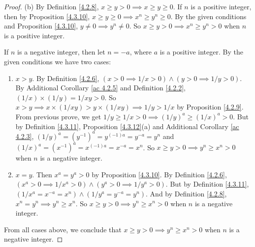 \begin{proof}{(b)}
By Definition \ref{4.2.8}, \(x \geq y > 0 \implies x \geq y \geq 0\).
If \(n\) is a positive integer, then by Proposition \ref{4.3.10}, \(x \geq y \geq 0 \implies x^n \geq y^n \geq 0\).
By the given conditions and Proposition \ref{4.3.10}, \(y \neq 0 \implies y^n \neq 0\).
So \(x \geq y > 0 \implies x^n \geq y^n > 0\) when \(n\) is a positive integer.

If \(n\) is a negative integer, then let \(n = -a\), where \(a\) is a positive integer.
By the given conditions we have two cases:
\begin{enumerate}[label=(\roman*)]
    \item \(x > y\).
    By Definition \ref{4.2.6}, \((x > 0 \implies 1 / x > 0) \land (y > 0 \implies 1 / y > 0)\).
    By Additional Corollary \ref{ac 4.2.5} and Definition \ref{4.2.2}, \((1 / x) \times (1 / y) = 1 / xy > 0\).
    So \(x > y \implies x \times (1 / xy) > y \times (1 / xy) \implies 1 / y > 1 / x\) by Proposition \ref{4.2.9}.
    From previous prove, we get \(1 / y \geq 1 / x > 0 \implies (1 / y)^a \geq (1 / x)^a > 0\).
    But by Definition \ref{4.3.11}, Proposition \ref{4.3.12}(a) and Additional Corollary \ref{ac 4.2.3}, \((1 / y)^a = (y^{-1})^a = y^{(-1)a} = y^{-a} = y^n\) and \((1 / x)^a = (x^{-1})^a = x^{(-1)a} = x^{-a} = x^n\).
    So \(x \geq y > 0 \implies y^n \geq x^n > 0\) when \(n\) is a negative integer.
    \item \(x = y\).
    Then \(x^a = y^a > 0\) by Proposition \ref{4.3.10}.
    By Definition \ref{4.2.6}, \((x^a > 0 \implies 1 / x^a > 0) \land (y^a > 0 \implies 1 / y^a > 0)\).
    But by Definition \ref{4.3.11}, \((1 / x^a = x^{-a} = x^n) \land (1 / y^a = y^{-a} = y^n)\).
    And by Definition \ref{4.2.8}, \(x^n = y^n \implies y^n \geq x^n\).
    So \(x \geq y > 0 \implies y^n \geq x^n > 0\) when \(n\) is a negative integer.
\end{enumerate}
From all cases above, we conclude that \(x \geq y > 0 \implies y^n \geq x^n > 0\) when \(n\) is a negative integer.
\end{proof}

